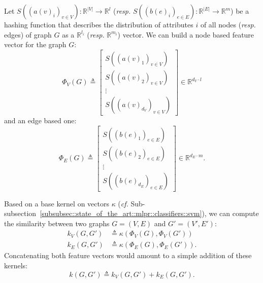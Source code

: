                 Let $S\left(\left(a(v)_i\right)_{v\in V}\right): \mathbb{R}^{\vert V\vert} \rightarrow \mathbb{R}^l$ (\textit{resp.} $S\left(\left(b(e)_i\right)_{e\in E}\right): \mathbb{R}^{\vert E\vert} \rightarrow \mathbb{R}^{m}$) be a hashing function that describes the distribution of attributes $i$ of all nodes (\textit{resp.} edges) of graph $G$ as a $\mathbb{R}^{l_i}$ (\textit{resp.} $\mathbb{R}^{m_i}$) vector.
                We can build a node based feature vector for the graph $G$:
                \begin{equation}
                    \label{eq::feature_node_graph}
                    \Phi_V(G) \triangleq \begin{bmatrix}
                        S\left(\left(a(v)_1\right)_{v\in V}\right)\\
                        S\left(\left(a(v)_2\right)_{v\in V}\right)\\
                        \vdots\\
                        S\left(\left(a(v)_{d_V}\right)_{v\in V}\right)
                    \end{bmatrix} \in \mathbb{R}^{d_V \cdot l}
                \end{equation}
                and an edge based one:
                \begin{equation}
                    \label{eq::feature_node_graph}
                    \Phi_E(G) \triangleq \begin{bmatrix}
                        S\left(\left(b(e)_1\right)_{e \in E}\right)\\
                        S\left(\left(b(e)_2\right)_{e \in E}\right)\\
                        \vdots\\
                        S\left(\left(b(e)_{d_E}\right)_{e \in E}\right)
                    \end{bmatrix} \in \mathbb{R}^{d_E \cdot m}.
                \end{equation}

                Based on a base kernel on vectors $\kappa$ (\textit{cf.} Sub-subsection~\ref{subsubsec::state_of_the_art::mlpr::classifiers::svm}), we can compute the similarity between two graphs $G = \left(V, E\right)$ and $G' = \left(V', E'\right)$:
                \begin{align}
                    \label{eq::feature_graph_kernel_nodes}
                    k_V(G, G') &\triangleq \kappa(\Phi_V(G), \Phi_V(G'))\\
                    \label{eq::feature_graph_kernel_edges}
                    k_E(G, G') &\triangleq \kappa(\Phi_E(G), \Phi_E(G')).
                \end{align}
                Concatenating both feature vectors would amount to a simple addition of these kernels:
                \begin{equation}
                    \label{eq::feature_graph_kernel_sum}
                    k(G, G') \triangleq k_V(G, G') + k_E(G, G').
                \end{equation}


